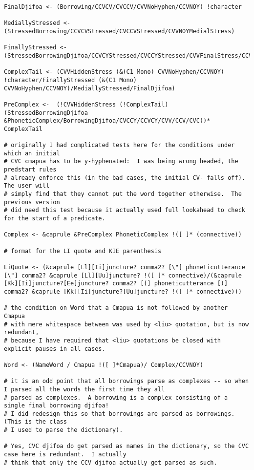 \documentclass{article}
\begin{document}
\begin{verbatim}
FinalDjifoa <- (Borrowing/CCVCV/CVCCV/CVVNoHyphen/CCVNOY) !character

MediallyStressed <- (StressedBorrowing/CCVCVStressed/CVCCVStressed/CVVNOYMedialStress)

FinallyStressed <-(StressedBorrowingDjifoa/CCVCYStressed/CVCCYStressed/CVVFinalStress/CCVStressed/CVCStressed)

ComplexTail <- (CVVHiddenStress (&(C1 Mono) CVVNoHyphen/CCVNOY) !character/FinallyStressed (&(C1 Mono) CVVNoHyphen/CCVNOY)/MediallyStressed/FinalDjifoa)

PreComplex <-  (!CVVHiddenStress (!ComplexTail)(StressedBorrowingDjifoa &PhoneticComplex/BorrowingDjifoa/CVCCY/CCVCY/CVV/CCV/CVC))* ComplexTail

# originally I had complicated tests here for the conditions under which an initial
# CVC cmapua has to be y-hyphenated:  I was being wrong headed, the predstart rules
# already enforce this (in the bad cases, the initial CV- falls off).  The user will
# simply find that they cannot put the word together otherwise.  The previous version
# did need this test because it actually used full lookahead to check for the start of a predicate.

Complex <- &caprule &PreComplex PhoneticComplex !([ ]* (connective))

# format for the LI quote and KIE parenthesis

LiQuote <- (&caprule [Ll][Ii]juncture? comma2? [\"] phoneticutterance [\"] comma2? &caprule [Ll][Uu]juncture? !([ ]* connective)/(&caprule [Kk][Ii]juncture?[Ee]juncture? comma2? [(] phoneticutterance [)] comma2? &caprule [Kk][Ii]juncture?[Uu]juncture? !([ ]* connective)))

# the condition on Word that a Cmapua is not followed by another Cmapua
# with mere whitespace between was used by <liu> quotation, but is now redundant,
# because I have required that <liu> quotations be closed with explicit pauses in all cases.

Word <- (NameWord / Cmapua !([ ]*Cmapua)/ Complex/CCVNOY)

# it is an odd point that all borrowings parse as complexes -- so when I parsed all the words the first time they all
# parsed as complexes.  A borrowing is a complex consisting of a single final borrowing djifoa!
# I did redesign this so that borrowings are parsed as borrowings.  (This is the class
# I used to parse the dictionary).

# Yes, CVC djifoa do get parsed as names in the dictionary, so the CVC case here is redundant.  I actually
# think that only the CCV djifoa actually get parsed as such.


\end{verbatim}
\end{document}
